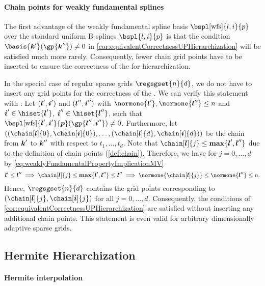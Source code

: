 \paragraph{Chain points for weakly fundamental splines}

The first advantage of the
weakly fundamental spline basis $\bspl[\wfs]{l,i}{p}$
over the standard uniform B-splines $\bspl{l,i}{p}$ is that
the condition $\basis{\*k'}(\gp{\*k''}) \not= 0$ in
\cref{cor:equivalentCorrectnessUPHierarchization} will be
satisfied much more rarely.
Consequently, fewer chain grid points have to be inserted to
ensure the correctness of the \up for hierarchization.

In the special case of regular sparse grids $\regsgset{n}{d}$,
we do not have to insert any grid points for the correctness of the \up.
We can verify this statement with
:
Let $({\boldsymbol{l}}',{\boldsymbol{i}}')$ and $({\boldsymbol{l}}'',{\boldsymbol{i}}'')$ with
$\normone{\*l'}, \normone{\*l''} \le n$ and
$\*i' \in \hiset{\*l'}$, $\*i'' \in \hiset{\*l''}$,
such that $\bspl[\wfs]{\*l',\*i'}{\*p}(\gp{\*l'',\*i''}) \not= 0$.
Furthermore, let $((\chain[\*l]{0}, \chain[\*i]{0}), \dotsc,
(\chain[\*l]{d}, \chain[\*i]{d}))$ be the chain
from ${\boldsymbol{k}}'$ to ${\boldsymbol{k}}''$ with respect to $t_1, \dotsc, t_d$.
Note that $\chain[\*l]{j} \le \vecmax\{\*l', \*l''\}$ due to the
definition of chain points (\cref{def:chain}).
Therefore, we have for $j = 0, \dotsc, d$
by \eqref{eq:weaklyFundamentalPropertyImplicationMV}
\begin{equation}
  \*l' \le \*l''
  \implies
  \chain[\*l]{j} \le \vecmax\{\*l', \*l''\} \le \*l''
  \implies
  \normone{\chain[\*l]{j}} \le \normone{\*l''} \le n.
\end{equation}
Hence, $\regsgset{n}{d}$ contains the grid points corresponding to
$(\chain[\*l]{j}, \chain[\*i]{j})$ for all $j = 0, \dotsc, d$.
Consequently, the conditions of
\cref{cor:equivalentCorrectnessUPHierarchization} are satisfied without
inserting any additional chain points.
This statement is even valid for arbitrary
dimensionally adaptive sparse grids.



\subsection{Hermite Hierarchization}
\label{sec:455hermiteHierarchization}

\paragraph{Hermite interpolation}

